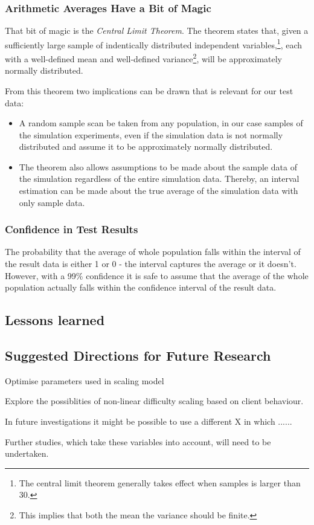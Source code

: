 \subsubsection{Arithmetic Averages Have a Bit of Magic}
That bit of magic is the \emph{Central Limit Theorem}. The theorem states that, given a sufficiently large sample of indentically distributed independent variables,\footnote{The central limit theorem generally takes effect when samples is larger than 30.}, each with a well-defined mean and well-defined variance\footnote{This implies that both the mean the variance should be finite.}, will be approximately normally distributed\cite{gunnar}.

From this theorem two implications can be drawn that is relevant for our test data:
\begin{itemize}
\item A random sample scan be taken from any population, in our case samples of the simulation experiments, even if the simulation data is not normally distributed and assume it to be approximately normally distributed.

\item The theorem also allows assumptions to be made about the sample data of the simulation regardless of the entire simulation data. Thereby, an interval estimation can be made about the true average of the simulation data with only sample data.
\end{itemize}

 \subsubsection{Confidence in Test Results}
The probability that the average of whole population falls within the interval of the result data is either 1 or 0 - the interval captures the average or it doesn't\cite{gunnar}. However, with a 99\% confidence it is safe to assume that the average of the whole population actually falls within the confidence interval of the result data. 


\subsection{Lessons learned}
\subsection{Suggested Directions for Future Research}

Optimise parameters used in scaling model

Explore the possiblities of non-linear difficulty scaling based on client behaviour. 

In future investigations it might be possible to use a different X in which ...... 

Further studies, which take these variables into account, will need to be undertaken.
